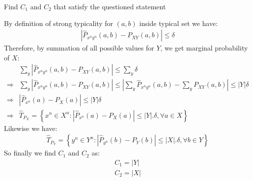 \documentclass[
  course = {{EE623 Information Theory}},
  quartile = {{4}},
  assignment = 7,
  name = {{Mohammad Mahdi Rahimi}},
  studentnumber = {{20208244}},
  email = {{mahi@kaist.ac.kr}},
  firstexercise = 1
]{aga-homework}
\begin{document}
\exercise
\subexercise Find $C_1$ and $C_2$ that satisfy the questioned statement

By definition of strong typicality for $(a,b)$ inside typical set we have:
\begin{equation} \label{eq8}
\begin{split}
\left|\hat{P}_{x^ny^n}(a,b) - P_{XY}(a,b) \right| \le \delta
\end{split}
\end{equation}
Therefore, by summation of all possible values for $Y$, we get marginal probability of $X$:
\begin{equation} \label{eq9}
\begin{split}
&\sum_y{\left|\hat{P}_{x^ny^n}(a,b) - P_{XY}(a,b) \right|} \le \sum_y{\delta}\\
\Rightarrow & \sum_y{\left|\hat{P}_{x^ny^n}(a,b) - P_{XY}(a,b) \right|} \le \left|\sum_y{\hat{P}_{x^ny^n}(a,b)} - \sum_y{P_{XY}(a,b)} \right| \le |Y|\delta\\
\Rightarrow & \left|\hat{P}_{x^n}(a) - P_{X}(a) \right| \le |Y|\delta\\
\Rightarrow & \hat{T}_{P_X} = \left\{x^n \in X^n : \left| \hat{P}_{x^n}(a) - P_X(a)\right| \le |Y|.\delta, \forall a \in X \right\}
\end{split}
\end{equation}
Likewise we have:
\begin{equation} \label{eq10}
\begin{split}
\hat{T}_{P_Y} = \left\{y^n \in Y^n : \left| \hat{P}_{y^n}(b) - P_Y(b)\right| \le |X|.\delta, \forall b \in Y \right\}
\end{split}
\end{equation}
So finally we find $C_1$ and $C_2$ as:
\begin{equation} \label{eq11}
\begin{split}
C_1 = |Y|\\
C_2 = |X|
\end{split}
\end{equation}
\end{document}
